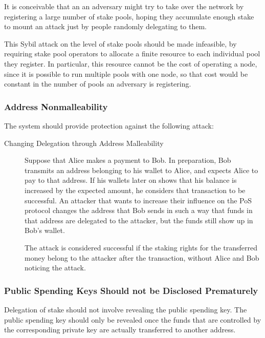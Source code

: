 \documentclass[11pt,a4paper]{article}
\begin{document}
It is conceivable that an an adversary might try to take over the
network by registering a large number of stake pools, hoping they
accumulate enough stake to mount an attack just by people randomly
delegating to them.

This Sybil attack on the level of stake pools should be made infeasible,
by requiring stake pool operators to allocate a finite resource to each
individual pool they register. In particular, this resource cannot be
the cost of operating a node, since it is possible to run multiple pools
with one node, so that cost would be constant in the number of pools an
adversary is registering.

\subsubsection{Address Nonmalleability}\label{address-nonmalleability}

The system should provide protection against the following attack:

\begin{description}
\item[Changing Delegation through Address Malleability]
Suppose that Alice makes a payment to Bob. In preparation, Bob transmits
an address belonging to his wallet to Alice, and expects Alice to pay to
that address. If his wallets later on shows that his balance is
increased by the expected amount, he considers that transaction to be
successful. An attacker that wants to increase their influence on the
PoS protocol changes the address that Bob sends in such a way that funds
in that address are delegated to the attacker, but the funds still show
up in Bob's wallet.

The attack is considered successful if the staking rights for the
transferred money belong to the attacker after the transaction, without
Alice and Bob noticing the attack.
\end{description}

\subsubsection{Public Spending Keys Should not be Disclosed
Prematurely}\label{public-spending-keys-should-not-be-disclosed-prematurely}

Delegation of stake should not involve revealing the public spending
key. The public spending key should only be revealed once the funds that
are controlled by the corresponding private key are actually transferred
to another address.
\end{document}
